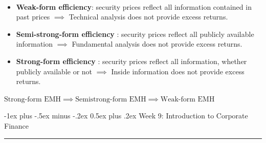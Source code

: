 \documentclass[10pt,landscape,a4paper]{article}
\makeatletter
\renewcommand{\section}{\@startsection{section}{1}{0mm}%
                                {-1ex plus -.5ex minus -.2ex}%
                                {0.5ex plus .2ex}%
                                {\normalfont\large\bfseries}}
\makeatother
\begin{document}
\begin{multicols*}{3}
\begin{description}[itemsep=0pt]
	\item[Three forms of market efficiency hypothesis MEH]  ~
	\begin{itemize}
\item {\bf Weak-form efficiency}: security prices reflect all information contained in past prices $\implies$ Technical analysis does not provide excess returns.
\item {\bf Semi-strong-form efficiency} : security prices reflect all publicly available information $\implies$ Fundamental analysis does not provide excess returns.
\item {\bf Strong-form efficiency }: security prices reflect all information, whether publicly available or not $\implies$  Inside information does not provide excess returns.		
	\end{itemize}
\end{description}

$ \text{Strong-form EMH} \implies \text{Semistrong-form EMH} \implies \text{Weak-form EMH}  $





\section{Week 9: Introduction to Corporate Finance}\smallskip \hrule height 1pt \smallskip


\end{multicols*}
\end{document}
